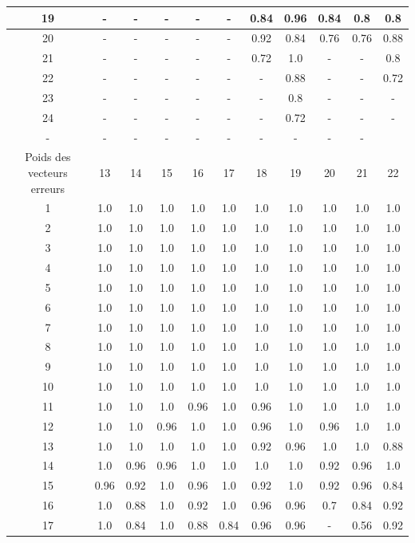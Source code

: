 \documentclass[french,nochapter,11pt]{rapportUB}
\begin{document}
\begin{table}[htbp]
\begin{tabular}{|c|c|c|c|c|c|c|c|c|c|c|}
    \hline
    19	&-	&-	&-	&-	&-	&0.84	&0.96	&0.84	&0.8	&0.8 \\
    \hline
    20	&-	&-	&-	&-	&-	&0.92	&0.84	&0.76	&0.76	&0.88 \\
    \hline
    21	&-	&-	&-	&-	&-	&0.72	&1.0	&-	&-	&0.8 \\
    \hline
    22	&-	&-	&-	&-	&-	&-	&0.88	&-	&-	&0.72 \\
    \hline
    23	&-	&-	&-	&-	&-	&-	&0.8	&-	&-	&- \\
    \hline
    24	&-	&-	&-	&-	&-	&-	&0.72	&-	&-	&- \\
    \hline
    - &- &- &- &- &- &- &- &- &-\\
    \hline
    Poids des vecteurs erreurs &13 &14 &15 &16 &17 &18 &19 &20 &21 &22\\
    \hline
    1 &1.0	&1.0	&1.0	&1.0	&1.0	&1.0	&1.0	&1.0	&1.0	&1.0 \\
    \hline
    2 &1.0	&1.0	&1.0	&1.0	&1.0	&1.0	&1.0	&1.0	&1.0	&1.0 \\
    \hline
    3 &1.0	&1.0	&1.0	&1.0	&1.0	&1.0	&1.0	&1.0	&1.0	&1.0 \\
    \hline
    4 &1.0	&1.0	&1.0	&1.0	&1.0	&1.0	&1.0	&1.0	&1.0	&1.0 \\
    \hline
    5 &1.0	&1.0	&1.0	&1.0	&1.0	&1.0	&1.0	&1.0	&1.0	&1.0 \\
    \hline
    6 &1.0	&1.0	&1.0	&1.0	&1.0	&1.0	&1.0	&1.0	&1.0	&1.0 \\
    \hline
    7 &1.0	&1.0	&1.0	&1.0	&1.0	&1.0	&1.0	&1.0	&1.0	&1.0 \\
    \hline
    8&1.0	&1.0	&1.0	&1.0	&1.0	&1.0	&1.0	&1.0	&1.0	&1.0 \\
    \hline
    9&1.0	&1.0	&1.0	&1.0	&1.0	&1.0	&1.0	&1.0	&1.0	&1.0 \\
    \hline
    10&1.0	&1.0	&1.0	&1.0	&1.0	&1.0	&1.0	&1.0	&1.0	&1.0 \\
    \hline
    11&1.0	&1.0	&1.0	&0.96	&1.0	&0.96	&1.0	&1.0	&1.0	&1.0 \\
    \hline
    12&1.0	&1.0	&0.96	&1.0	&1.0	&0.96	&1.0	&0.96	&1.0	&1.0 \\
    \hline
    13&1.0	&1.0	&1.0	&1.0	&1.0	&0.92	&0.96	&1.0	&1.0	&0.88 \\
    \hline
    14&1.0	&0.96	&0.96	&1.0	&1.0	&1.0	&1.0	&0.92	&0.96	&1.0 \\
    \hline
    15&0.96	&0.92	&1.0	&0.96	&1.0	&0.92	&1.0	&0.92	&0.96	&0.84 \\
    \hline
    16&1.0	&0.88	&1.0	&0.92	&1.0	&0.96	&0.96	&0.7	&0.84	&0.92 \\
    \hline
    17&1.0	&0.84	&1.0	&0.88	&0.84	&0.96	&0.96	&-	&0.56	&0.92 \\

\end{tabular}
\end{table}
\end{document}

